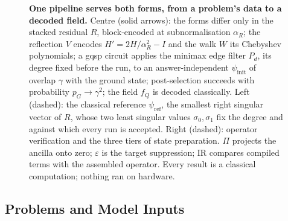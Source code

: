 \begin{figure}[!htbp]
    \caption[The model: one pipeline from a problem's data to a decoded field]{\textbf{One pipeline serves both forms, from a problem's data to a decoded field.} Centre (solid arrows): the forms differ only in the stacked residual $R$, block-encoded at subnormalisation $\alpha_R$; the reflection $V$ encodes $H'=2H/\alpha_R^2-I$ and the walk $W$ its Chebyshev polynomials; a \gls{gqsp} circuit applies the minimax edge filter $P_d$, its degree fixed before the run, to an answer-independent $\psi_{\mathrm{init}}$ of overlap $\gamma$ with the ground state; post-selection succeeds with probability $p_G\to\gamma^2$; the field $f_Q$ is decoded classically. Left (dashed): the classical reference $\psi_{\mathrm{ref}}$, the smallest right singular vector of $R$, whose two least singular values $\sigma_0,\sigma_1$ fix the degree and against which every run is accepted. Right (dashed): operator verification and the three tiers of state preparation. $\Pi$ projects the ancilla onto zero; $\varepsilon$ is the target suppression; IR compares compiled terms with the assembled operator. Every result is a classical computation; nothing ran on hardware.}
    \label{fig:pipeline}
\end{figure}

\subsection{Problems and Model Inputs}
\label{sec:pipeline-inputs}

